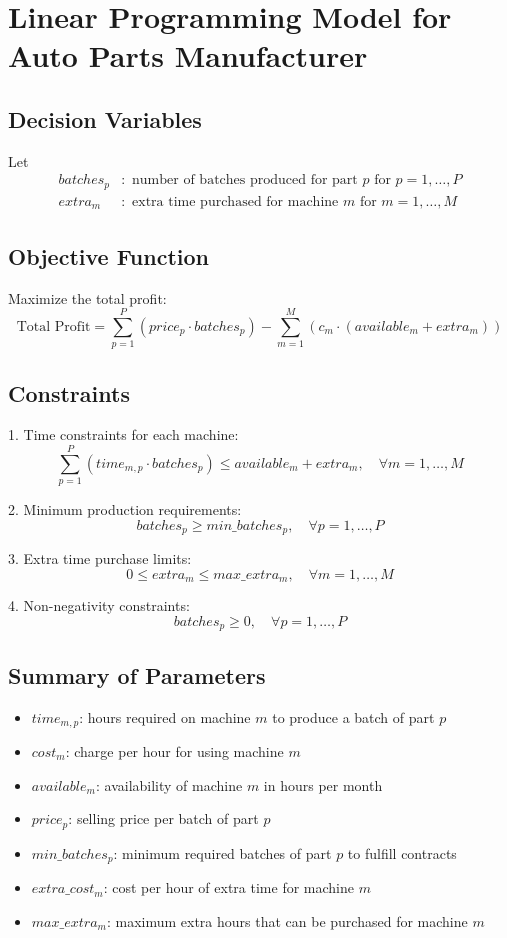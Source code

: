 \documentclass{article}
\begin{document}
\section*{Linear Programming Model for Auto Parts Manufacturer}

\subsection*{Decision Variables}
Let 
\begin{align*}
batches_{p} & : \text{ number of batches produced for part } p \text{ for } p = 1, \ldots, P \\
extra_{m} & : \text{ extra time purchased for machine } m \text{ for } m = 1, \ldots, M
\end{align*}

\subsection*{Objective Function}
Maximize the total profit:
\[
\text{Total Profit} = \sum_{p=1}^{P} (price_{p} \cdot batches_{p}) - \sum_{m=1}^{M} \left(c_{m} \cdot (available_{m} + extra_{m})\right)
\]

\subsection*{Constraints}
1. Time constraints for each machine:
\[
\sum_{p=1}^{P} (time_{m,p} \cdot batches_{p}) \leq available_{m} + extra_{m}, \quad \forall m = 1, \ldots, M
\]

2. Minimum production requirements:
\[
batches_{p} \geq min\_batches_{p}, \quad \forall p = 1, \ldots, P
\]

3. Extra time purchase limits:
\[
0 \leq extra_{m} \leq max\_extra_{m}, \quad \forall m = 1, \ldots, M
\]

4. Non-negativity constraints:
\[
batches_{p} \geq 0, \quad \forall p = 1, \ldots, P
\]

\subsection*{Summary of Parameters}
\begin{itemize}
    \item $time_{m,p}$: hours required on machine $m$ to produce a batch of part $p$
    \item $cost_{m}$: charge per hour for using machine $m$
    \item $available_{m}$: availability of machine $m$ in hours per month
    \item $price_{p}$: selling price per batch of part $p$
    \item $min\_batches_{p}$: minimum required batches of part $p$ to fulfill contracts
    \item $extra\_cost_{m}$: cost per hour of extra time for machine $m$
    \item $max\_extra_{m}$: maximum extra hours that can be purchased for machine $m$
\end{itemize}
\end{document}
